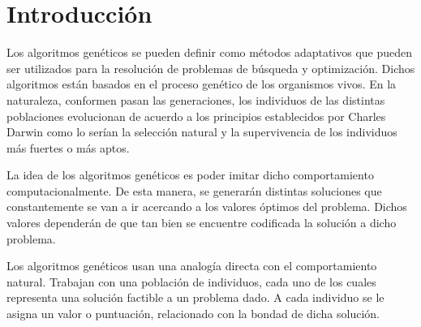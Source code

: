 \documentclass[conference]{C:/Program Files (x86)/MiKTeX 2.9/tex/latex/ltxmisc/IEEEtran}
\begin{document}










%
\IEEEpeerreviewmaketitle



\section{Introducción}
Los algoritmos genéticos se pueden definir como métodos adaptativos que pueden ser utilizados para la resolución de problemas de búsqueda y optimización. Dichos algoritmos están basados en el proceso genético de los organismos vivos. En la naturaleza, conformen pasan las generaciones, los individuos de las distintas poblaciones evolucionan de acuerdo a los principios establecidos por Charles Darwin como lo serían la selección natural y la supervivencia de los individuos más fuertes o más aptos.

\par 
La idea de los algoritmos genéticos es poder imitar dicho comportamiento computacionalmente. De esta manera, se generarán distintas soluciones que constantemente se van a ir acercando a los valores óptimos del problema. Dichos valores dependerán de que tan bien se encuentre codificada la solución a dicho problema.

\par
Los algoritmos genéticos usan una analogía directa con el comportamiento natural. Trabajan con una población de individuos, cada uno de los cuales representa una solución factible a un problema dado. A cada individuo se le asigna un valor o puntuación, relacionado con la bondad de dicha solución.
\end{document}
